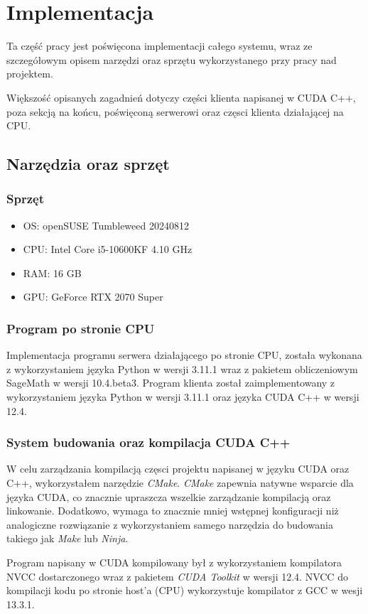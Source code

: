 \newpage
\section{Implementacja}
Ta część pracy jest poświęcona implementacji całego systemu,
wraz ze szczegółowym opisem narzędzi oraz sprzętu wykorzystanego
przy pracy nad projektem.
\par
Większość opisanych zagadnień dotyczy części klienta napisanej w CUDA C++,
poza sekcją na końcu, poświęconą serwerowi oraz częsci klienta działającej na CPU.

\subsection{Narzędzia oraz sprzęt}
\subsubsection{Sprzęt}
\begin{itemize}
    \item OS: openSUSE Tumbleweed 20240812
    \item CPU: Intel Core i5-10600KF 4.10 GHz
    \item RAM: 16 GB
    \item GPU: GeForce RTX 2070 Super
\end{itemize}

\subsubsection{Program po stronie CPU}
Implementacja programu serwera działającego po stronie CPU, została wykonana z wykorzystaniem
języka Python w wersji 3.11.1 wraz z pakietem obliczeniowym SageMath w wersji 10.4.beta3.
Program klienta został zaimplementowany z wykorzystaniem języka Python w wersji 3.11.1 oraz
języka CUDA C++ w wersji 12.4.

\subsubsection{System budowania oraz kompilacja CUDA C++}
W celu zarządzania kompilacją częsci projektu napisanej w języku CUDA oraz C++,
wykorzystałem narzędzie \textit{CMake}.
\textit{CMake} zapewnia natywne wsparcie dla języka CUDA,
co znacznie upraszcza wszelkie zarządzanie kompilacją oraz linkowanie.
Dodatkowo, wymaga to znacznie mniej wstępnej konfiguracji niż analogiczne
rozwiązanie z wykorzystaniem samego narzędzia do budowania takiego jak \textit{Make} lub \textit{Ninja}.
\par
Program napisany w CUDA kompilowany był z wykorzystaniem kompilatora NVCC dostarczonego wraz z pakietem
\textit{CUDA Toolkit} w wersji 12.4.
NVCC do kompilacji kodu po stronie host'a (CPU) wykorzystuje kompilator z GCC w wesji 13.3.1.


